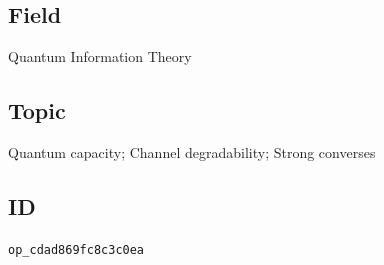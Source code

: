 \subsection*{Field}

Quantum Information Theory

\subsection*{Topic}

Quantum capacity; Channel degradability; Strong converses

\subsection*{ID}

\texttt{op\_cdad869fc8c3c0ea}
